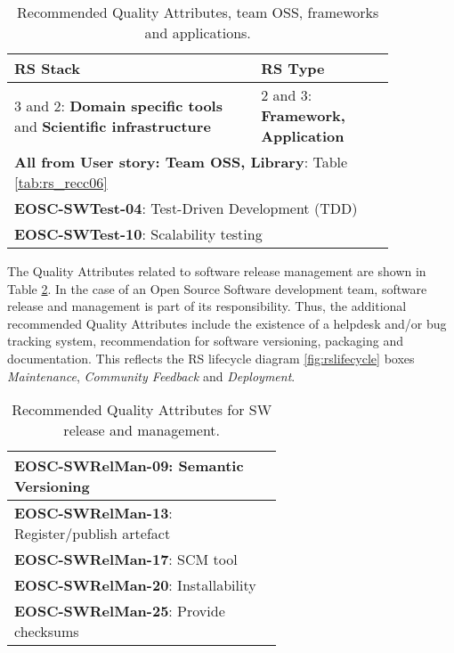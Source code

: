 \begin{table}[h]
  \centering
  \scriptsize
  \begin{tabular}{|p{0.55\linewidth}|p{0.3\linewidth}|} \hline

    \textbf{RS Stack} & \textbf{RS Type} \\ \hline \hline
    3 and 2: \textbf{Domain specific tools} and  \textbf{Scientific infrastructure} & 2 and 3: \textbf{Framework, Application} \\ \hline
    \multicolumn{2}{|l|}{\textbf{All from User story: Team OSS, Library}: Table \ref{tab:rs_recc06}} \\ \hline
    \multicolumn{2}{|l|}{\textbf{EOSC-SWTest-04}: Test-Driven Development (TDD)} \\ \hline
    \multicolumn{2}{|l|}{\textbf{EOSC-SWTest-10}: Scalability testing} \\ \hline

  \end{tabular}
  \caption{Recommended Quality Attributes, team OSS, frameworks and applications.}
  \label{tab:rs_recc07}
\end{table}

The Quality Attributes related to software release management are shown in Table \ref{tab:rs_rel}. In the case of an Open Source Software development team, software release and management is part of its responsibility. Thus, the additional recommended Quality Attributes include the existence of a helpdesk and/or bug tracking system, recommendation for software versioning, packaging and documentation. This reflects the RS lifecycle diagram \ref{fig:rslifecycle} boxes \textit{Maintenance}, \textit{Community Feedback} and \textit{Deployment}.

\begin{table}[h]
    \centering
    \scriptsize
    \begin{tabular}{|p{0.6\linewidth}|} \hline

        \textbf{EOSC-SWRelMan-09}: Semantic Versioning \\ \hline
        \textbf{EOSC-SWRelMan-13}: Register/publish artefact \\ \hline
        \textbf{EOSC-SWRelMan-17}: SCM tool \\ \hline
        \textbf{EOSC-SWRelMan-20}: Installability \\ \hline
        \textbf{EOSC-SWRelMan-25}: Provide checksums \\ \hline

    \end{tabular}
    \caption{Recommended Quality Attributes for SW release and management.}
    \label{tab:rs_rel}
\end{table}

